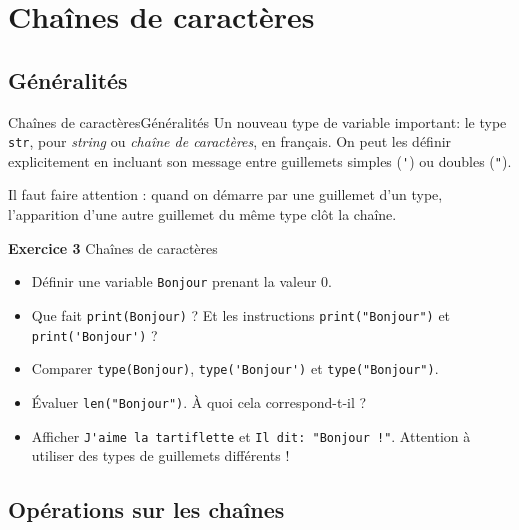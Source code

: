 \documentclass[10pt]{beamer}
\begin{document}
\section{Chaînes de caractères}
\subsection{Généralités}

\begin{frame}[fragile]{Chaînes de caractères}{Généralités}
Un nouveau type de variable important: le type \verb|str|, pour \textit{string} ou \textit{chaîne de caractères}, en français. On peut les définir explicitement en incluant son message entre guillemets simples (\verb|'|) ou doubles (\verb|"|).\pause

Il faut faire attention : quand on démarre par une guillemet d'un type, l'apparition d'une autre guillemet du même type clôt la chaîne.\pause

	\begin{block}{\textbf{Exercice 3} Chaînes de caractères}
	
	\begin{itemize}[<+->]
	\item Définir une variable \verb|Bonjour| prenant la valeur $0$.
	
	\item Que fait \verb|print(Bonjour)| ? Et les instructions \verb|print("Bonjour")| et \verb|print('Bonjour')| ?
	
	\item Comparer \verb|type(Bonjour)|, \verb|type('Bonjour')| et \verb|type("Bonjour")|.
	
	\item Évaluer \verb|len("Bonjour")|. À quoi cela correspond-t-il ?
    
    \item Afficher \verb|J'aime la tartiflette| et  \verb|Il dit: "Bonjour !"|. Attention à utiliser des types de guillemets différents !
    \end{itemize}
\end{block}

\end{frame}

\subsection{Opérations sur les chaînes}
\end{document}
